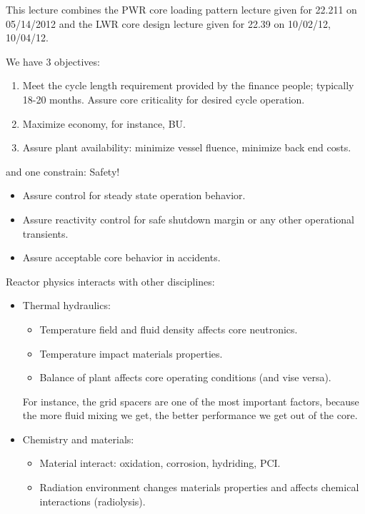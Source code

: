 \documentclass{school-22.211-notes}
\date{May 14, 2012}
\begin{document}
\maketitle

This lecture combines the PWR core loading pattern lecture given for 22.211 on 05/14/2012 and the LWR core design lecture given for 22.39 on 10/02/12, 10/04/12. 


We have 3 objectives:
\begin{enumerate}
\item Meet the cycle length requirement provided by the finance people; typically 18-20 months. Assure core criticality for desired cycle operation. 
\item Maximize economy, for instance, BU. 
\item Assure plant availability: minimize vessel fluence, minimize back end costs. 
\end{enumerate}
and one constrain: Safety!
  \begin{itemize}
    \item Assure control for steady state operation behavior. 
    \item Assure reactivity control for safe shutdown margin or any other operational transients. 
    \item Assure acceptable core behavior in accidents. 
  \end{itemize}
Reactor physics interacts with other disciplines: 
\begin{itemize}
\item Thermal hydraulics: 
  \begin{itemize}
  \item Temperature field and fluid density affects core neutronics. 
  \item Temperature impact materials properties. 
  \item Balance of plant affects core operating conditions (and vise versa). 
  \end{itemize}
  For instance, the grid spacers are one of the most important factors, because the more fluid mixing we get, the better performance we get out of the core. 

\item Chemistry and materials: 
  \begin{itemize}
    \item Material interact: oxidation, corrosion, hydriding, PCI.
    \item Radiation environment changes materials properties and affects chemical interactions (radiolysis). 
  \end{itemize}
\end{itemize}
\end{document}
